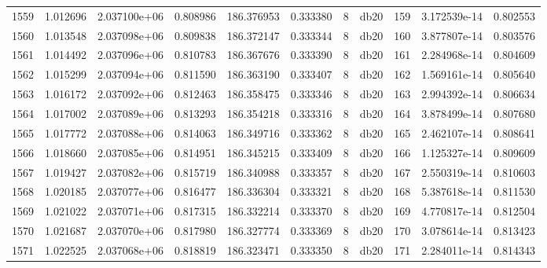 \begin{tabular}{lrrrrrrlrrr}
1559 &    1.012696 &        2.037100e+06 &  0.808986 &              186.376953 &    0.333380 &       8 &         db20 &    159 &   3.172539e-14 &      0.802553 \\
1560 &    1.013548 &        2.037098e+06 &  0.809838 &              186.372147 &    0.333344 &       8 &         db20 &    160 &   3.877807e-14 &      0.803576 \\
1561 &    1.014492 &        2.037096e+06 &  0.810783 &              186.367676 &    0.333390 &       8 &         db20 &    161 &   2.284968e-14 &      0.804609 \\
1562 &    1.015299 &        2.037094e+06 &  0.811590 &              186.363190 &    0.333407 &       8 &         db20 &    162 &   1.569161e-14 &      0.805640 \\
1563 &    1.016172 &        2.037092e+06 &  0.812463 &              186.358475 &    0.333346 &       8 &         db20 &    163 &   2.994392e-14 &      0.806634 \\
1564 &    1.017002 &        2.037089e+06 &  0.813293 &              186.354218 &    0.333316 &       8 &         db20 &    164 &   3.878499e-14 &      0.807680 \\
1565 &    1.017772 &        2.037088e+06 &  0.814063 &              186.349716 &    0.333362 &       8 &         db20 &    165 &   2.462107e-14 &      0.808641 \\
1566 &    1.018660 &        2.037085e+06 &  0.814951 &              186.345215 &    0.333409 &       8 &         db20 &    166 &   1.125327e-14 &      0.809609 \\
1567 &    1.019427 &        2.037082e+06 &  0.815719 &              186.340988 &    0.333357 &       8 &         db20 &    167 &   2.550319e-14 &      0.810603 \\
1568 &    1.020185 &        2.037077e+06 &  0.816477 &              186.336304 &    0.333321 &       8 &         db20 &    168 &   5.387618e-14 &      0.811530 \\
1569 &    1.021022 &        2.037071e+06 &  0.817315 &              186.332214 &    0.333370 &       8 &         db20 &    169 &   4.770817e-14 &      0.812504 \\
1570 &    1.021687 &        2.037070e+06 &  0.817980 &              186.327774 &    0.333369 &       8 &         db20 &    170 &   3.078614e-14 &      0.813423 \\
1571 &    1.022525 &        2.037068e+06 &  0.818819 &              186.323471 &    0.333350 &       8 &         db20 &    171 &   2.284011e-14 &      0.814343 \\

\end{tabular}
